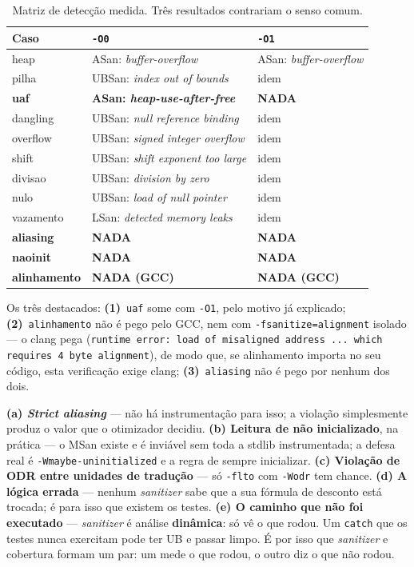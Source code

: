 \begin{table}[htbp]
\centering
\caption{Matriz de detecção medida. Três resultados contrariam o senso comum.}
\label{tab:matriz-ub}
\footnotesize
\begin{tabular}{@{}lll@{}}
\toprule
\textbf{Caso} & \texttt{-O0} & \texttt{-O1} \\
\midrule
heap          & ASan: \emph{buffer-overflow}      & ASan: \emph{buffer-overflow} \\
pilha         & UBSan: \emph{index out of bounds} & idem \\
\textbf{uaf}  & \textbf{ASan: \emph{heap-use-after-free}} & \textbf{NADA} \\
dangling      & UBSan: \emph{null reference binding} & idem \\
overflow      & UBSan: \emph{signed integer overflow} & idem \\
shift         & UBSan: \emph{shift exponent too large} & idem \\
divisao       & UBSan: \emph{division by zero}    & idem \\
nulo          & UBSan: \emph{load of null pointer} & idem \\
vazamento     & LSan: \emph{detected memory leaks} & idem \\
\textbf{aliasing}    & \textbf{NADA}              & \textbf{NADA} \\
\textbf{naoinit}     & \textbf{NADA}              & \textbf{NADA} \\
\textbf{alinhamento} & \textbf{NADA (GCC)}        & \textbf{NADA (GCC)} \\
\bottomrule
\end{tabular}
\end{table}

Os três destacados: \textbf{(1)}~\texttt{uaf} some com \texttt{-O1}, pelo motivo
já explicado; \textbf{(2)}~\texttt{alinhamento} não é pego pelo GCC, nem com
\texttt{-fsanitize=alignment} isolado --- o clang pega (\texttt{runtime error:
load of misaligned address ... which requires 4 byte alignment}), de modo que, se
alinhamento importa no seu código, esta verificação exige clang;
\textbf{(3)}~\texttt{aliasing} não é pego por nenhum dos dois.

\begin{armadilha}
\textbf{(a) \emph{Strict aliasing}} --- não há instrumentação para isso; a
violação simplesmente produz o valor que o otimizador decidiu.
\textbf{(b) Leitura de não inicializado}, na prática --- o MSan existe e é
inviável sem toda a stdlib instrumentada; a defesa real é
\texttt{-Wmaybe-uninitialized} e a regra de sempre inicializar.
\textbf{(c) Violação de ODR entre unidades de tradução} --- só \texttt{-flto} com
\texttt{-Wodr} tem chance.
\textbf{(d) A lógica errada} --- nenhum \emph{sanitizer} sabe que a sua fórmula de
desconto está trocada; é para isso que existem os testes.
\textbf{(e) O caminho que não foi executado} --- \emph{sanitizer} é análise
\textbf{dinâmica}: só vê o que rodou. Um \texttt{catch} que os testes nunca
exercitam pode ter UB e passar limpo. É por isso que \emph{sanitizer} e cobertura
formam um par: um mede o que rodou, o outro diz o que não rodou.
\end{armadilha}

